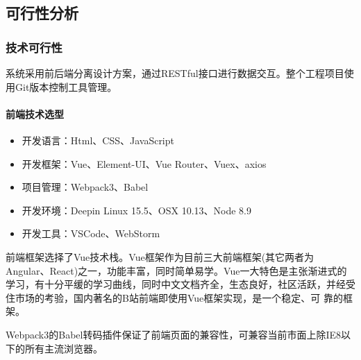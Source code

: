 \documentclass[titlepage,UTF8,linespread=1.5]{ctexart}
\begin{document}
\subsection{可行性分析}
\subsubsection{技术可行性}
系统采用前后端分离设计方案，通过RESTful接口进行数据交互。整个工程项目使 用Git版本控制工具管理。\par
\paragraph{前端技术选型}
\begin{itemize}
    \item 开发语言：Html、CSS、JavaScript
    \item 开发框架：Vue、Element-UI、Vue Router、Vuex、axios
    \item 项目管理：Webpack3、Babel
    \item 开发环境：Deepin Linux 15.5、OSX 10.13、Node 8.9
    \item 开发工具：VSCode、WebStorm
\end{itemize}\par
前端框架选择了Vue技术栈。Vue框架作为目前三大前端框架(其它两者为Angular、React)之一，功能丰富，同时简单易学。Vue一大特色是主张渐进式的
学习，有十分平缓的学习曲线，同时中文文档齐全，生态良好，社区活跃，并经受住市场的考验，国内著名的B站前端即使用Vue框架实现，是一个稳定、可
靠的框架。\par
Webpack3的Babel转码插件保证了前端页面的兼容性，可兼容当前市面上除IE8以下的所有主流浏览器。\par
\end{document}
